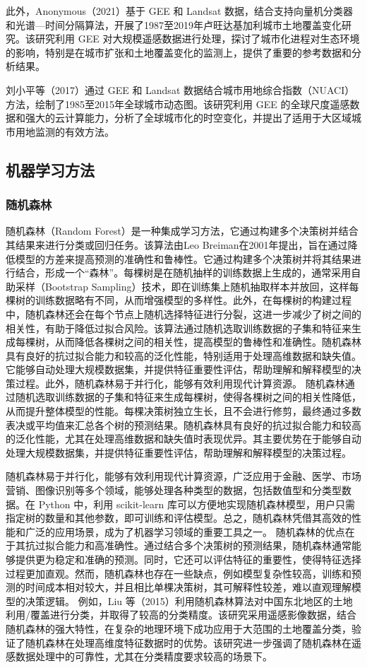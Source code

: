 \documentclass{article}
\begin{document}
	此外，Anonymous（2021）基于 GEE 和 Landsat 数据，结合支持向量机分类器和光谱—时间分隔算法，开展了1987至2019年卢旺达基加利城市土地覆盖变化研究。该研究利用 GEE 对大规模遥感数据进行处理，探讨了城市化进程对生态环境的影响，特别是在城市扩张和土地覆盖变化的监测上，提供了重要的参考数据和分析结果。
	
	刘小平等（2017）通过 GEE 和 Landsat 数据结合城市用地综合指数（NUACI）方法，绘制了1985至2015年全球城市动态图。该研究利用 GEE 的全球尺度遥感数据和强大的云计算能力，分析了全球城市化的时空变化，并提出了适用于大区域城市用地监测的有效方法。
	\subsection{机器学习方法}
	
	\subsubsection{随机森林}
	随机森林（Random Forest）是一种集成学习方法，它通过构建多个决策树并结合其结果来进行分类或回归任务。该算法由Leo Breiman在2001年提出，旨在通过降低模型的方差来提高预测的准确性和鲁棒性。它通过构建多个决策树并将其结果进行结合，形成一个“森林”。每棵树是在随机抽样的训练数据上生成的，通常采用自助采样（Bootstrap Sampling）技术，即在训练集上随机抽取样本并放回，这样每棵树的训练数据略有不同，从而增强模型的多样性。此外，在每棵树的构建过程中，随机森林还会在每个节点上随机选择特征进行分裂，这进一步减少了树之间的相关性，有助于降低过拟合风险。该算法通过随机选取训练数据的子集和特征来生成每棵树，从而降低各棵树之间的相关性，提高模型的鲁棒性和准确性。随机森林具有良好的抗过拟合能力和较高的泛化性能，特别适用于处理高维数据和缺失值。它能够自动处理大规模数据集，并提供特征重要性评估，帮助理解和解释模型的决策过程。此外，随机森林易于并行化，能够有效利用现代计算资源。
	随机森林通过随机选取训练数据的子集和特征来生成每棵树，使得各棵树之间的相关性降低，从而提升整体模型的性能。每棵决策树独立生长，且不会进行修剪，最终通过多数表决或平均值来汇总各个树的预测结果。随机森林具有良好的抗过拟合能力和较高的泛化性能，尤其在处理高维数据和缺失值时表现优异。其主要优势在于能够自动处理大规模数据集，并提供特征重要性评估，帮助理解和解释模型的决策过程。

	
	随机森林易于并行化，能够有效利用现代计算资源，广泛应用于金融、医学、市场营销、图像识别等多个领域，能够处理各种类型的数据，包括数值型和分类型数据。在 Python 中，利用 scikit-learn 库可以方便地实现随机森林模型，用户只需指定树的数量和其他参数，即可训练和评估模型。总之，随机森林凭借其高效的性能和广泛的应用场景，成为了机器学习领域的重要工具之一。
	随机森林的优点在于其抗过拟合能力和高准确性。通过结合多个决策树的预测结果，随机森林通常能够提供更为稳定和准确的预测。同时，它还可以评估特征的重要性，使得特征选择过程更加直观。然而，随机森林也存在一些缺点，例如模型复杂性较高，训练和预测的时间成本相对较大，并且相比单棵决策树，其可解释性较差，难以直观理解模型的决策逻辑。
	例如，Liu 等（2015）利用随机森林算法对中国东北地区的土地利用/覆盖进行分类，并取得了较高的分类精度。该研究采用遥感影像数据，结合随机森林的强大特性，在复杂的地理环境下成功应用于大范围的土地覆盖分类，验证了随机森林在处理高维度特征数据时的优势。该研究进一步强调了随机森林在遥感数据处理中的可靠性，尤其在分类精度要求较高的场景下。
	
\end{document}
